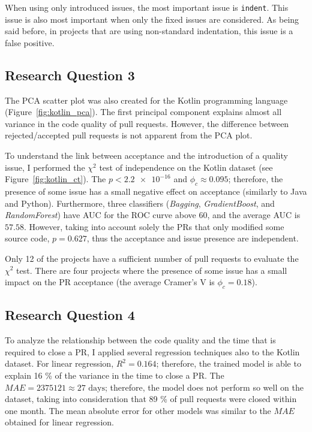 \documentclass[digital,oneside,oldtable,nolof,nolot,nocover]{fithesis4}
\begin{document}
When using only introduced issues, the most important issue is \texttt{indent}.
This issue is also most important when only the fixed issues are considered.
As being said before, in projects that are using non-standard indentation,
this issue is a false positive.
\subsection{Research Question 3}
\label{sec:orgcf8a513}
The PCA scatter plot was also created for the Kotlin programming language (Figure~\ref{fig:kotlin_pca}).
The first principal component explains almost all variance in the code quality of pull requests.
However, the difference between rejected/accepted pull requests is not apparent from the PCA plot.

To understand the link between acceptance and the introduction of a
quality issue, I performed the \(\chi^2\) test of independence
on the Kotlin dataset (see Figure~\ref{fig:kotlin_ct}).
The \(p < \num{2.2e-16}\) and \(\phi_c \approx 0.095\); therefore, the presence of some issue has a small
negative effect on acceptance (similarly to Java and Python).
Furthermore, three classifiers (\emph{Bagging}, \emph{GradientBoost}, and \emph{RandomForest})
have AUC for the ROC curve above 60, and the average AUC is \(57.58\).
However, taking into account solely the PRs that only modified some source
code, \(p = 0.627\), thus the acceptance and issue presence are independent.

Only 12 of the projects have a sufficient number of pull requests to evaluate
the \(\chi^2\) test. There are four projects where the presence of some issue
has a small impact on the PR acceptance (the average Cramer's V is \(\phi_c = 0.18\)).
\subsection{Research Question 4}
\label{sec:orgf9fa09f}
To analyze the relationship between the code quality and the time that is required to
close a PR, I applied several regression techniques also to the Kotlin
dataset.  For linear regression, \(R^2 = 0.164\); therefore, the trained model is
able to explain 16 \% of the variance in the time to close a PR. The \(MAE =
    2375121 \approx 27\text{ days}\); therefore, the model does not perform so well
on the dataset, taking into consideration that 89 \% of pull requests were
closed within one month. The mean absolute error for other models was similar
to the \(MAE\) obtained for linear regression.
\FloatBarrier
\end{document}
